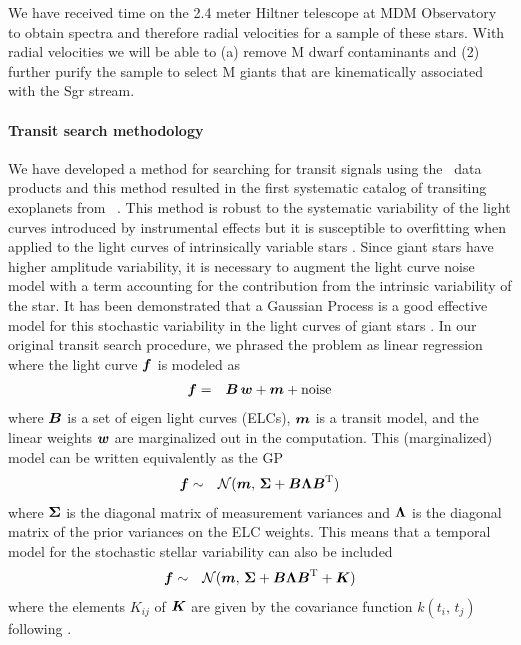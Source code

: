 \documentclass[letterpaper,12pt,preprint]{hack_aastex}
\begin{document}

We have received time on the 2.4 meter Hiltner telescope at MDM Observatory to
obtain spectra and therefore radial velocities for a sample of these stars.
With radial velocities we will be able to (a) remove M dwarf contaminants and
(2) further purify the sample to select M giants that are kinematically
associated with the Sgr stream.

\paragraph{Transit search methodology}

We have developed a method for searching for transit signals using the \KT\
data products and this method resulted in the first systematic catalog of
transiting exoplanets from \KT\ \citep{Foreman-Mackey:2015}.
This method is robust to the systematic variability of the light curves
introduced by instrumental effects but it is susceptible to overfitting when
applied to the light curves of intrinsically variable stars
\citep{Montet:2015}.
Since giant stars have higher amplitude variability, it is necessary to
augment the light curve noise model with a term accounting for the
contribution from the intrinsic variability of the star.
It has been demonstrated that a Gaussian Process \citep[GP;][]{Rasmussen:2006,
Ambikasaran:2014} is a good effective model for this stochastic variability in
the light curves of giant stars \citep{Barclay:2015}.
In our original transit search procedure, we phrased the problem as linear
regression \citep{Foreman-Mackey:2015} where the light curve ${{\boldsymbol{f}}}$ is
modeled as
\begin{eqnarray}
{\ensuremath{{\boldsymbol{f}}}} &=& {{\boldsymbol{B}}}\,{{\boldsymbol{w}}} + {{\boldsymbol{m}}} + \mathrm{noise}
\end{eqnarray}
where ${{\boldsymbol{B}}}$ is a set of eigen light curves (ELCs), ${{\boldsymbol{m}}}$ is a
transit model, and the linear weights ${{\boldsymbol{w}}}$ are marginalized out in the
computation.
This (marginalized) model can be written equivalently as the GP
\citep{Rasmussen:2006}
\begin{eqnarray}
{\ensuremath{{\boldsymbol{f}}}} &\sim& \mathcal{N} ({{\boldsymbol{m}}},\,
{{\boldsymbol{\Sigma}}} + {{\boldsymbol{B}}}{{\boldsymbol{\Lambda}}}{{\boldsymbol{B}}}^\mathrm{T})
\end{eqnarray}
where ${{\boldsymbol{\Sigma}}}$ is the diagonal matrix of measurement variances and
${{\boldsymbol{\Lambda}}}$ is the diagonal matrix of the prior variances on the ELC
weights.
This means that a temporal model for the stochastic stellar variability can
also be included
\begin{eqnarray}
{\ensuremath{{\boldsymbol{f}}}} &\sim& \mathcal{N} ({{\boldsymbol{m}}},\,
{{\boldsymbol{\Sigma}}} + {{\boldsymbol{B}}}{{\boldsymbol{\Lambda}}}{{\boldsymbol{B}}}^\mathrm{T} + {{\boldsymbol{K}}})
\end{eqnarray}
where the elements $K_{ij}$ of ${{\boldsymbol{K}}}$ are given by the covariance function
$k(t_i,\,t_j)$ following \citep{Barclay:2015}.
\end{document}
